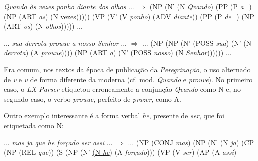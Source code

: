 \documentclass[portuguese]{textolivre}
\begin{document}
\begin{description}[topsep=10pt, parsep=2pt, itemindent=!]
\item[(06)\label{06}] 
\textit{\underline{Qvando} às vezes ponho diante dos olhos} ... $\Rightarrow$ (NP (N' \uline{(N \textit{Qvando})} (PP (P \textit{a}\_) (NP (ART \textit{as}) (N \textnormal{vezes}))))) (VP (V' (V \textit{ponho}) (ADV \textit{diante})) (PP (P \textit{de}\_) (NP (ART \textit{os}) (N \textit{olhos}))))) ...

\item[(07)\label{07}] 
... \textit{sua derrota prouue a nosso Senhor} ... $\Rightarrow$ ... (NP (NP (N' (POSS \textit{sua}) (N' (N \textit{derrota}) \uline{(A \textit{prouue})}))) (NP (ART \textit{a}) (N' (POSS \textit{nosso}) (N \textit{Senhor})))))) ...
\end{description}

Era comum, nos textos da época de publicação da \textit{Peregrinação}, o uso alternado de \textit{v} e \textit{u} de forma diferente da moderna (cf. mod. \textit{Quando} e \textit{prouve}). No primeiro caso, o \textit{LX-Parser} etiquetou erroneamente a conjunção \textit{Qvando} como N e, no segundo caso, o verbo \textit{prouue}, perfeito de \textit{prazer}, como A.

Outro exemplo interessante é a forma verbal \textit{he}, presente de \textit{ser}, que foi etiquetada como N:

\begin{description}[topsep=10pt, parsep=2pt, itemindent=!]
\item[(08)\label{08}] 
... \textit{mas ja que \underline{he} forçado ser assi} ... $\Rightarrow$ ... (NP (CONJ \textit{mas}) (NP (N' (N \textit{ja}) (CP (NP (REL \textit{que})) (S (NP (N' \uline{(N \textit{he})} (A \textit{forçado}))) (VP (V \textit{ser}) (AP (A \textit{assi})
\end{description}
\end{document}
